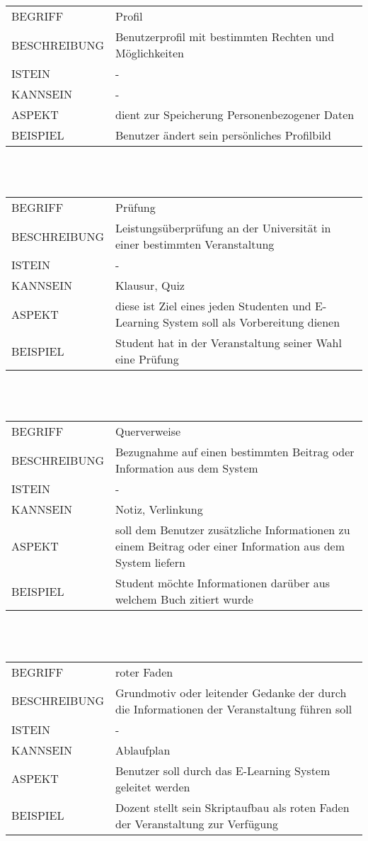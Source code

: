 \documentclass[12pt,a4paper]{article}
\begin{document}
\begin{tabular}{l p{10cm}}
BEGRIFF 	 & Profil \\ 
BESCHREIBUNG & Benutzerprofil mit bestimmten Rechten und Möglichkeiten \\ 
ISTEIN   	 & - \\
KANNSEIN 	 & -\\ 
ASPEKT   	 & dient zur Speicherung Personenbezogener Daten\\
BEISPIEL 	 & Benutzer ändert sein persönliches Profilbild\\
\hline
\end{tabular}\\\\  

\begin{tabular}{l p{10cm}}
BEGRIFF 	 & Prüfung \\ 
BESCHREIBUNG & Leistungsüberprüfung an der Universität in einer bestimmten Veranstaltung\\ 
ISTEIN   	 & - \\
KANNSEIN 	 & Klausur, Quiz\\ 
ASPEKT   	 & diese ist Ziel eines jeden Studenten und E-Learning System soll als Vorbereitung dienen\\
BEISPIEL 	 & Student hat in der Veranstaltung seiner Wahl eine Prüfung\\
\hline
\end{tabular}\\\\  

\begin{tabular}{l p{10cm}}
BEGRIFF 	 & Querverweise \\ 
BESCHREIBUNG & Bezugnahme auf einen bestimmten Beitrag oder Information aus dem System\\ 
ISTEIN   	 & - \\
KANNSEIN 	 & Notiz, Verlinkung\\ 
ASPEKT   	 & soll dem Benutzer zusätzliche Informationen zu einem Beitrag 				   oder einer Information aus dem System liefern\\
BEISPIEL 	 & Student möchte Informationen darüber aus welchem Buch zitiert wurde\\
\hline
\end{tabular}\\\\  

\begin{tabular}{l p{10cm}}
BEGRIFF 	 & roter Faden \\ 
BESCHREIBUNG & Grundmotiv oder leitender Gedanke der durch die Informationen 				   der Veranstaltung führen soll\\ 
ISTEIN   	 & - \\
KANNSEIN 	 & Ablaufplan \\ 
ASPEKT   	 & Benutzer soll durch das E-Learning System geleitet werden\\
BEISPIEL 	 & Dozent stellt sein Skriptaufbau als roten Faden der Veranstaltung zur Verfügung\\
\hline
\end{tabular}\\\\  
\end{document}
